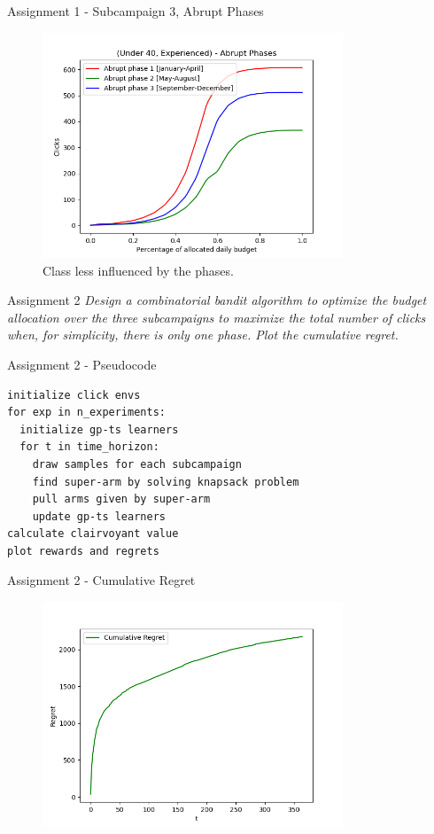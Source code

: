 \documentclass[11pt]{beamer}
\begin{document}
\begin{frame}{Assignment 1 - Subcampaign 3, Abrupt Phases}
\begin{figure}[hbtp]
\centering
\includegraphics[width=0.8\textwidth]{images/subcampaign_3_abrupt_phases.png}
\caption{Class less influenced by the phases.}
\end{figure}
\end{frame}

\begin{frame}{Assignment 2}
\textit{Design a combinatorial bandit algorithm to optimize the budget allocation over the three subcampaigns to maximize the total number of clicks when, for simplicity, there is only one phase. Plot the cumulative regret.}
\end{frame}

\begin{frame}[fragile]{Assignment 2 - Pseudocode}
\begin{lstlisting}
initialize click envs
for exp in n_experiments:
  initialize gp-ts learners
  for t in time_horizon:
    draw samples for each subcampaign
    find super-arm by solving knapsack problem
    pull arms given by super-arm
    update gp-ts learners
calculate clairvoyant value
plot rewards and regrets
\end{lstlisting}
\end{frame}

\begin{frame}{Assignment 2 -  Cumulative Regret}
\begin{figure}[hbtp]
\centering
\includegraphics[width=0.8\textwidth]{images/assignment_2_cum_regret.png}
\caption{}
\end{figure}
\end{frame}
\end{document}
